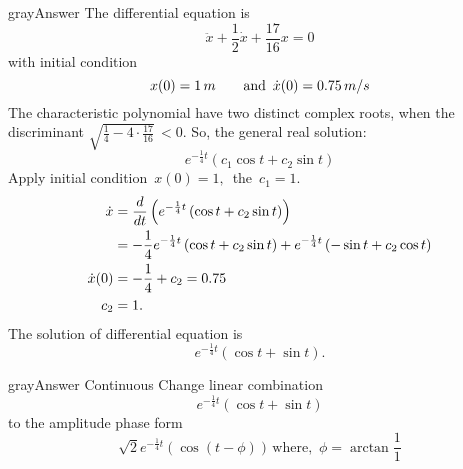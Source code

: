 \begin{mybox}{gray}{Answer}
  The differential equation is
  \begin{equation*}
    \ddot{x} + \frac{1}{2} \dot{x} + \frac{17}{16} x = 0 
  \end{equation*}
  with initial condition
  \begin{equation*}
    x(0) = 1 \, m \qquad \text{and \,} \dot{x}(0) = 0.75 \, m/s
  \end{equation*}
  The characteristic polynomial have two distinct complex roots, when the
  discriminant $\displaystyle \sqrt{\frac{1}{4} - 4\cdot \frac{17}{16} } \, < 0 $. 
  So, the general real solution:
  \begin{equation*}
    \displaystyle e^{-\frac{1}{4} t} \left( c_1 \cos t + c_2 \sin t\right)
  \end{equation*}
  Apply initial condition $\, x(0) = 1 ,\,$ the $\, c_1 = 1$.
  \begin{align*}
    \displaystyle \dot{x}
    \displaystyle &= \displaystyle \frac{d}{dt}
                    \left( e^{-\frac{1}{4} t} \left( \cos t + c_2 \sin t\right) \right) \\
    \displaystyle &= -\frac{1}{4} e^{-\frac{1}{4} t} \left( \cos t + c_2 \sin t\right) 
                    + e^{-\frac{1}{4} t} \left( -\sin t + c_2 \cos t \right) \\
    \displaystyle \dot{x}(0)
    \displaystyle &= -\frac{1}{4} + c_2 = 0.75 \\
    \displaystyle c_2 &= 1.
  \end{align*}
  The solution of differential equation is
  \begin{equation*}
    \displaystyle e^{-\frac{1}{4} t} \left( \cos t + \sin t\right). 
  \end{equation*}
\end{mybox}
\clearpage

\begin{mybox}{gray}{Answer Continuous}
  Change linear combination
  \begin{equation*}
    \displaystyle e^{-\frac{1}{4} t} \left( \cos t + \sin t\right) 
  \end{equation*}
  to the amplitude phase form
  \begin{equation*}
    \displaystyle \sqrt{2} e^{-\frac{1}{4} t} \left( \cos (t - \phi) \right) \,
    \text{where, } \, \phi = \arctan \frac{1}{1}
  \end{equation*}
  
\end{mybox}

